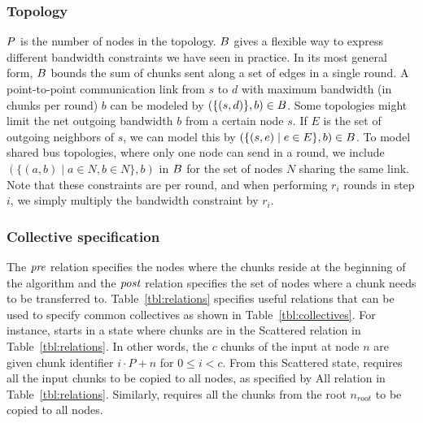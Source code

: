 \subsubsection{Topology}
\label{sec:topology}
$P$ is the number of nodes in the topology. $B$ gives a flexible
way to express different bandwidth constraints we have seen in
practice. In its most general form, $B$ bounds the sum of chunks
sent along a set of edges in a single round. A point-to-point
communication link from $s$ to $d$ with maximum bandwidth (in chunks
per round) $b$ can be modeled by $(\{(s, d)\}, b) \in B$. Some
topologies might limit the net outgoing bandwidth $b$ from a certain
node $s$. If $E$ is the set of outgoing neighbors of $s$, we can model
this by $(\{(s, e) \mid e \in E\}, b) \in B$. To model shared bus
topologies, where only one node can send in a round, we include
$(\{(a, b) \mid a \in N, b \in N\}, b)$ in $B$ for the set of nodes
$N$ sharing the same link. Note that these constraints are per round,
and when performing $r_i$ rounds in step $i$, we simply multiply the
bandwidth constraint by $r_i$.

\newcommand{\relAll}{All\xspace}
\newcommand{\relRoot}{Root\xspace}
\newcommand{\relScattered}{Scattered\xspace}
\newcommand{\relTranspose}{Transpose\xspace}
\newcommand{\chunkReduce}{\left\lfloor\frac{i}{\size}\right\rfloor}

\subsubsection{Collective specification}
\label{sec:specifications}
The $\mathit{pre}$ relation specifies the nodes where the chunks reside at the
beginning of the algorithm and the $\mathit{post}$ relation specifies the set
of nodes where a chunk needs to be transferred to.
Table~\ref{tbl:relations} specifies useful relations that can be used
to specify common collectives as shown in Table~\ref{tbl:collectives}.
For instance, \allgather starts in a state where chunks are in the
\relScattered relation in Table~\ref{tbl:relations}. In other words,
the $c$ chunks of the input at node $n$ are given chunk identifier
$i\cdot P + n$ for $0 \leq i < c$. From this \relScattered state,
\allgather requires all the input chunks to be copied to all nodes, as
specified by \relAll relation in Table~\ref{tbl:relations}. Similarly,
\broadcast requires all the chunks from the root $n_{root}$ to be
copied to all nodes.

